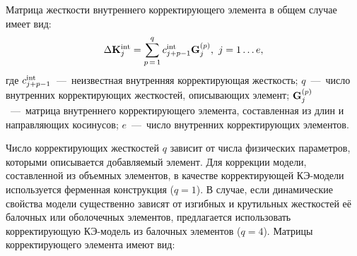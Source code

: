Матрица жесткости внутреннего корректирующего элемента в общем случае имеет вид:
\begin{equation}
	\Delta \mathbf{K} ^ {\text{int}}_j = \sum\limits_{p\,=\,1}^{q} c ^ {\text{int}}_{j+p-1} \mathbf{G}_j^{(p)}, \ j = 1 \hdots e, \label{eq:internalStiffMatrix}
\end{equation}
где $ c ^ {\text{int}}_{j+p-1} $~---~неизвестная внутренняя корректирующая жесткость; $ q $~---~число внутренних корректирующих жесткостей, описывающих элемент; $ \mathbf{G}_j^{(p)} $~---~матрица внутреннего корректирующего элемента, составленная из длин и направляющих косинусов; $ e $~---~число внутренних корректирующих элементов. 

Число корректирующих жесткостей $ q $ зависит от числа физических параметров, которыми описывается добавляемый элемент. Для коррекции модели, составленной из объемных элементов, в качестве корректирующей КЭ-модели используется ферменная конструкция ($ q = 1 $). В случае, если динамические свойства модели существенно зависят от изгибных и крутильных жесткостей её балочных или оболочечных элементов, предлагается использовать корректирующую КЭ-модель из балочных элементов ($ q = 4 $). Матрицы корректирующего элемента имеют вид:
